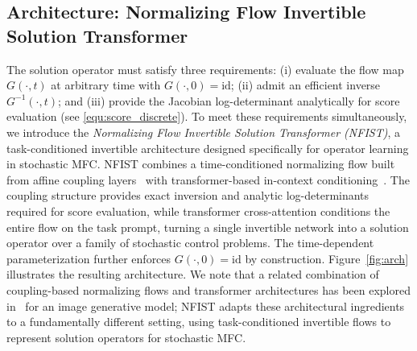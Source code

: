 \documentclass[preprint]{elsarticle}
\begin{document}
\subsection{Architecture: Normalizing Flow Invertible Solution Transformer}\label{sec:arch}

The solution operator must satisfy three requirements: (i) evaluate the flow map $G(\cdot,t)$ at arbitrary time with $G(\cdot,0)=\mathrm{id}$; (ii) admit an efficient inverse $G^{-1}(\cdot,t)$; and (iii) provide the Jacobian log-determinant analytically for score evaluation (see \eqref{equ:score_discrete}).
To meet these requirements simultaneously, we introduce the \emph{Normalizing Flow Invertible Solution Transformer (NFIST)}, a task-conditioned invertible architecture designed specifically for operator learning in stochastic MFC. NFIST combines a time-conditioned normalizing flow built from affine coupling layers~\cite{dinh2017realnvp,rezende2015flow,Kobyzev2021,papamakarios2021nf} with transformer-based in-context conditioning~\cite{vaswani2017attention,yang2023icon}. The coupling structure provides exact inversion and analytic log-determinants required for score evaluation, while transformer cross-attention conditions the entire flow on the task prompt, turning a single invertible network into a solution operator over a family of stochastic control problems. The time-dependent parameterization further enforces $G(\cdot,0)=\mathrm{id}$ by construction. Figure~\ref{fig:arch} illustrates the resulting architecture.
We note that a related combination of coupling-based normalizing flows and transformer architectures has been explored in~\cite{kolesnikov2024jet} for an image generative model; NFIST adapts these architectural ingredients to a fundamentally different setting, using task-conditioned invertible flows to represent solution operators for stochastic MFC.
\end{document}
